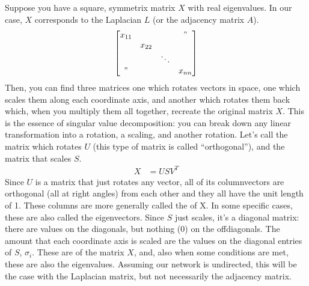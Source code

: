 \documentclass[letterpaper,10pt,english]{jupyterBook}
\begin{document}
\sphinxAtStartPar
{} Suppose you have a square, symmetrix matrix \(X\) with real eigenvalues. In our case, \(X\) corresponds to the Laplacian \(L\) (or the adjacency matrix \(A\)).
\begin{align*}
\begin{bmatrix}
    x_{11} & & & " \\
    & x_{22} & & \\
    & & \ddots & \\
    " & & & x_{nn}
    \end{bmatrix}
\end{align*}
\sphinxAtStartPar
Then, you can find three matrices \sphinxhyphen{} one which rotates vectors in space, one which scales them along each coordinate axis, and another which rotates them back \sphinxhyphen{} which, when you multiply them all together, recreate the original matrix \(X\). This is the essence of singular value decomposition: you can break down any linear transformation into a rotation, a scaling, and another rotation. Let’s call the matrix which rotates \(U\) (this type of matrix is called “orthogonal”), and the matrix that scales \(S\).
\begin{align*}
    X &= U S V^T
\end{align*}
\sphinxAtStartPar
Since \(U\) is a matrix that just rotates any vector, all of its column\sphinxhyphen{}vectors are orthogonal (all at right angles) from each other and they all have the unit length of 1. These columns are more generally called the  of X. In some specific cases, these are also called the eigenvectors. Since \(S\) just scales, it’s a diagonal matrix: there are values on the diagonals, but nothing (0) on the off\sphinxhyphen{}diagonals. The amount that each coordinate axis is scaled are the values on the diagonal entries of \(S\), \(\sigma_{i}\). These are  of the matrix \(X\), and, also when some conditions are met, these are also the eigenvalues. Assuming our network is undirected, this will be the case with the Laplacian matrix, but not necessarily the adjacency matrix.
\end{document}
